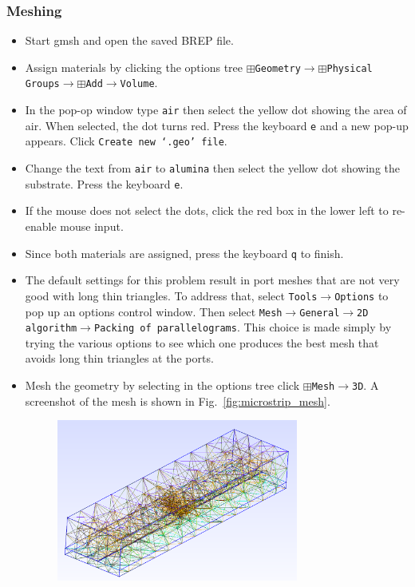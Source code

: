 \documentclass[titlepage]{article}
\renewcommand\_{\textunderscore\linebreak[1]}
\begin{document}
\subsubsection{Meshing}
\begin{itemize}
\item Start gmsh and open the saved BREP file.
\item Assign materials by clicking the options tree $\boxplus$\texttt{Geometry}$\rightarrow$$\boxplus$\texttt{Physical Groups}$\rightarrow$$\boxplus$\texttt{Add}$\rightarrow$\texttt{Volume}.
\item In the pop-op window type \texttt{air} then select the yellow dot showing the area of air.  When selected, the dot turns red.  Press the keyboard \texttt{e} and a new pop-up appears.  Click \texttt{Create new `.geo' file}.
\item Change the text from \texttt{air} to \texttt{alumina} then select the yellow dot showing the substrate.  Press the keyboard \texttt{e}.
\item If the mouse does not select the dots, click the red box in the lower left to re-enable mouse input.
\item Since both materials are assigned, press the keyboard \texttt{q} to finish.
\item The default settings for this problem result in port meshes that are not very good with long thin triangles.  To address that, select \texttt{Tools}$\rightarrow$\texttt{Options} to pop up an options control window. Then select \texttt{Mesh}$\rightarrow$\texttt{General}$\rightarrow$\texttt{2D algorithm}$\rightarrow$\texttt{Packing of parallelograms}.  This choice is made simply by trying the various options to see which one produces the best mesh that avoids long thin triangles at the ports.
\item Mesh the geometry by selecting in the options tree click $\boxplus$\texttt{Mesh}$\rightarrow$\texttt{3D}. A screenshot of the mesh is shown in Fig.~\ref{fig:microstrip_mesh}.
\begin{figure}
  \centering
  \includegraphics[width=0.75\textwidth]{../tutorials/OpenParEM3D/microstrip_step/screenshots/microstrip_mesh}

\end{figure}
\end{itemize}
\end{document}

